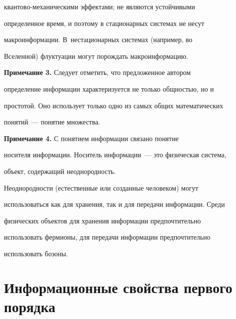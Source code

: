 {кван\-то\-во-ме\-ха\-ни\-че\-ски\-ми эффектами; не являются устойчивыми 


определенное время, и поэтому в стационарных сис\-те\-мах не несут 


макроинформации. В~нестационарных системах (например, во 


Вселенной) флуктуации могут порождать макроинформацию.


   


\smallskip





\noindent


\textbf{Примечание 3.} Следует отметить, что предложенное автором 


определение информации характеризуется не только общностью, но и 


простотой. Оно использует только одно из самых общих математических 


понятий~--- понятие множества.


   


\smallskip





\noindent


\textbf{Примечание 4.} С понятием информации связано понятие 


носителя информации. Носитель информации~--- это физическая система, 


объект, содержащий неоднородность.


   


   Неоднородности (естественные или созданные человеком) могут 


использоваться как для хранения, так и для передачи информации. Среди 


физических объектов для хранения информации предпочтительно 


использовать фермионы, для передачи информации предпочтительно 


использовать бозоны.}


   


\section{Информационные свойства первого порядка}






